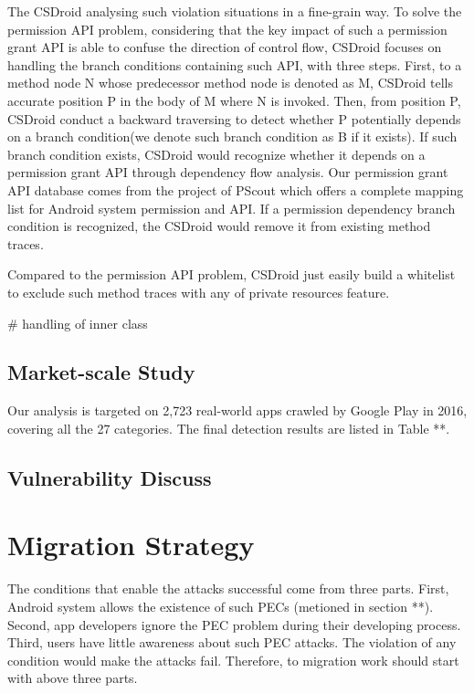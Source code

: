 \documentclass{sig-alternate-05-2015}
\begin{document}
The CSDroid analysing such violation situations in a fine-grain way. To solve the permission API problem, considering that the key impact of such a permission grant API is able to confuse the direction of control flow, CSDroid focuses on handling the branch conditions containing such API, with three steps. First, to a method node N whose predecessor method node is denoted as M, CSDroid tells accurate position P in the body of M where N is invoked. Then, from position P, CSDroid conduct a backward traversing to detect whether P potentially depends on a branch condition(we denote such branch condition as B if it exists). If such branch condition exists, CSDroid would recognize whether it depends on a permission grant API through dependency flow analysis. Our permission grant API database comes from the project of PScout\cite{au2012pscout} which offers a complete mapping list for Android system permission and API. If a permission dependency branch condition is recognized, the CSDroid would remove it from existing method traces.

Compared to the permission API problem, CSDroid just easily build a whitelist to exclude such method traces with any of private resources feature.



\# handling of inner class  

\subsection{Market-scale Study}
Our analysis is targeted on 2,723 real-world apps crawled by Google Play in 2016, covering all the 27 categories. The final detection results are listed in Table **.


\subsection{Vulnerability Discuss}

\section{Migration Strategy}
The conditions that enable the attacks successful come from three parts. First, Android system allows the existence of such PECs (metioned in section **). Second, app developers ignore the PEC problem during their developing process. Third, users have little awareness about such PEC attacks. The violation of any condition would make the attacks fail. Therefore, to migration work should start with above three parts.
 
\end{document}
